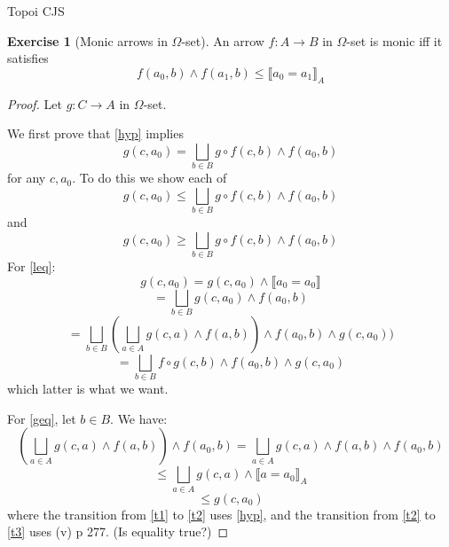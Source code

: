 \documentclass{article}
\newcommand{\lb}{\llbracket}
\newcommand{\rb}{\rrbracket}
\theoremstyle{definition}
\newtheorem{ex}{Exercise}
\begin{document}
\large 
\linespread{1.5} 

{\Large Topoi 
\hfill  CJS}

\begin{ex}[Monic arrows in $\Omega$-set]
    An arrow $f : A \to B$ in $\Omega$-set is monic iff it satisfies
    \begin{equation}\label{hyp}
        f(a_0, b) \wedge f(a_1, b) \leq \lb a_0 = a_1\rb_A
    \end{equation}
\end{ex}
\begin{proof}
    Let $g : C \to A$ in $\Omega$-set. 
    
    We first prove that \eqref{hyp} implies
    \begin{equation}\label{eq}
        g(c, a_0) = \bigsqcup_{b \in B} g\circ f(c, b)\wedge f(a_0, b)
    \end{equation}
    for any $c, a_0$. To do this we show each of 
    \begin{equation}\label{leq}
        g(c, a_0) \leq \bigsqcup_{b \in B} g\circ f(c, b)\wedge f(a_0, b)
    \end{equation}
    and 
    \begin{equation}\label{geq}
        g(c, a_0) \geq \bigsqcup_{b \in B} g\circ f(c, b)\wedge f(a_0, b)
    \end{equation}
    For \eqref{leq}:
    \begin{equation}\label{w}
        g(c, a_0) = g(c, a_0) \wedge \lb a_0 = a_0 \rb 
    \end{equation}
    \begin{equation}\label{w}
        = \bigsqcup_{b \in B} g(c, a_0) \wedge f(a_0, b) 
    \end{equation}
    \begin{equation}\label{w}
        = \bigsqcup_{b \in B} (\bigsqcup_{a \in A} g(c, a) \wedge f(a, b)) 
        \wedge 
        f(a_0, b) \wedge g(c, a_0))
    \end{equation}
    \begin{equation}\label{w}
        = \bigsqcup_{b \in B} f \circ g(c,b) 
        \wedge 
        f(a_0, b) \wedge g(c, a_0)
    \end{equation}
    which latter is what we want.
    

    For \eqref{geq}, let $b \in B$. We have:
    \begin{equation}\label{t1}
        (\bigsqcup_{a \in A} g(c, a) \wedge f(a, b)) \wedge f(a_0, b) = \bigsqcup_{a \in A} g(c, a) \wedge f(a, b) \wedge f(a_0, b)
    \end{equation}
    \begin{equation}\label{t2}
        \leq \bigsqcup_{a \in A} g(c, a) \wedge \lb a = a_0 \rb_A
    \end{equation}
    \begin{equation}\label{t3}
        \leq g(c, a_0)
    \end{equation}
    where the transition from \eqref{t1} to \eqref{t2} uses \eqref{hyp},
    and the transition from \eqref{t2} to \eqref{t3} uses (v) p 277.
    (Is equality true?)


\end{proof}
\end{document}

